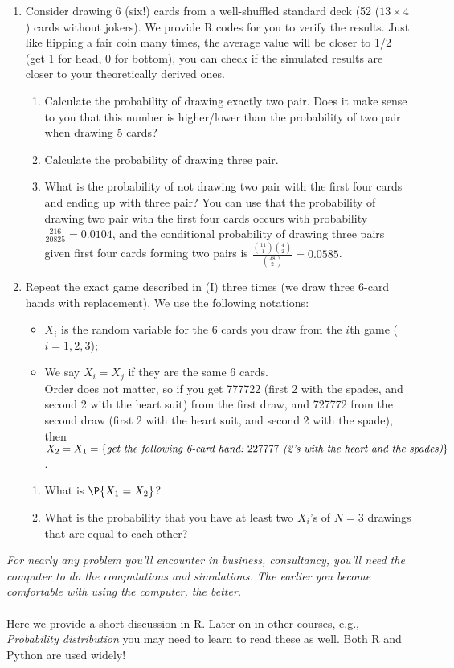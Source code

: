 \begin{exercise}
	\begin{enumerate}
		\item Consider drawing 6 (six!) cards from a well-shuffled standard deck (52 ($13\times 4$) cards without jokers). We provide  {R} codes for you to verify the results. Just like flipping a fair coin many times, the average value will be closer to 1/2 (get 1 for head, 0 for bottom), you can check if the simulated results are closer to your theoretically derived ones.
		\begin{enumerate}
			\item Calculate the probability of drawing exactly two pair. Does it make sense to you that this number is higher/lower than the probability of two pair when drawing 5 cards?
			\item Calculate the probability of drawing three pair.
			\item What is the probability of not drawing two pair with the first four cards and ending up with three pair? You can use that the probability of drawing two pair with the first four cards occurs with probability $\frac{216}{20825}=0.0104$, and the conditional probability of drawing three pairs given first four cards forming two pairs is $\frac{{11\choose 1}{4 \choose 2} }{{48 \choose 2}}=0.0585$.
		\end{enumerate}
	\item Repeat the exact game described in (I) three times (we draw three 6-card hands with replacement). We use the following notations:
	\begin{itemize}
		\item $X_i$ is the random variable for the 6 cards you draw from the $i$th game ($i=1,2,3$);
		\item We say $X_i=X_j$ if they are the same 6 cards.\\ {\scriptsize Order does not matter, so if you get 777722 (first 2 with the spades, and second 2 with the heart suit) from the first draw, and 727772 from the second draw (first 2 with the heart suit, and second 2 with the spade),
			then $X_2=X_1=\{\textit{get the following 6-card~} \\ \textit{hand:~} 227777 \textit{~(2's with the heart and the spades)}\}$}.\\
	\end{itemize}
\begin{enumerate}
	\item What is $\P{X_1=X_2}$? 
	\item What is the probability that you have at least two $X_i$'s of $N=3$ drawings that are equal to each other? 
\end{enumerate}
	\end{enumerate}
\textit{For nearly any problem you'll encounter in business, consultancy, you'll need the computer to do the computations and simulations. The earlier you become comfortable with using the computer, the better.} \\~\\
Here we provide a short discussion in R. Later on in other courses, e.g., \textit{Probability distribution} you may need to learn to read these as well. Both R and Python are used widely!


\end{exercise}
